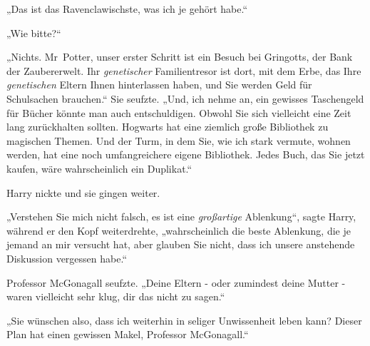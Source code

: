 „Das ist das Ravenclawischste, was ich je gehört habe.“

„Wie bitte?“

„Nichts. Mr~Potter, unser erster Schritt ist ein Besuch bei Gringotts, der Bank der Zaubererwelt. Ihr \emph{genetischer} Familientresor ist dort, mit dem Erbe, das Ihre \emph{genetischen} Eltern Ihnen hinterlassen haben, und Sie werden Geld für Schulsachen brauchen.“ Sie seufzte. „Und, ich nehme an, ein gewisses Taschengeld für Bücher könnte man auch entschuldigen. Obwohl Sie sich vielleicht eine Zeit lang zurückhalten sollten. Hogwarts hat eine ziemlich große Bibliothek zu magischen Themen. Und der Turm, in dem Sie, wie ich stark vermute, wohnen werden, hat eine noch umfangreichere eigene Bibliothek. Jedes Buch, das Sie jetzt kaufen, wäre wahrscheinlich ein Duplikat.“

Harry nickte und sie gingen weiter.

„Verstehen Sie mich nicht falsch, es ist eine \emph{großartige} Ablenkung“, sagte Harry, während er den Kopf weiterdrehte, „wahrscheinlich die beste Ablenkung, die je jemand an mir versucht hat, aber glauben Sie nicht, dass ich unsere anstehende Diskussion vergessen habe.“

Professor McGonagall seufzte. „Deine Eltern - oder zumindest deine Mutter - waren vielleicht sehr klug, dir das nicht zu sagen.“

„Sie wünschen also, dass ich weiterhin in seliger Unwissenheit leben kann? Dieser Plan hat einen gewissen Makel, Professor McGonagall.“

